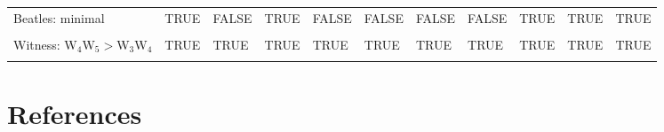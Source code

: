 \documentclass[
  10pt,
]{scrartcl}
\begin{document}
\begin{table}[H]
{\begin{tabular}[t]{lllllllllll}
Beatles: minimal & TRUE & FALSE & TRUE & FALSE & FALSE & FALSE & FALSE & TRUE & TRUE & TRUE\\
\cellcolor{gray!6}{Witness: W$_1$W$_2>$W$_3$W$_4$} & \cellcolor{gray!6}{TRUE} & \cellcolor{gray!6}{TRUE} & \cellcolor{gray!6}{TRUE} & \cellcolor{gray!6}{TRUE} & \cellcolor{gray!6}{TRUE} & \cellcolor{gray!6}{TRUE} & \cellcolor{gray!6}{TRUE} & \cellcolor{gray!6}{TRUE} & \cellcolor{gray!6}{TRUE} & \cellcolor{gray!6}{TRUE}\\
Witness: W$_4$W$_5>$W$_3$W$_4$ & TRUE & TRUE & TRUE & TRUE & TRUE & TRUE & TRUE & TRUE & TRUE & TRUE\\
\cellcolor{gray!6}{Success rate} & \cellcolor{gray!6}{50\%} & \cellcolor{gray!6}{50\%} & \cellcolor{gray!6}{67\%} & \cellcolor{gray!6}{50\%} & \cellcolor{gray!6}{50\%} & \cellcolor{gray!6}{67\%} & \cellcolor{gray!6}{67\%} & \cellcolor{gray!6}{100\%} & \cellcolor{gray!6}{92\%} & \cellcolor{gray!6}{100\%}\\
\bottomrule
\end{tabular}}
\end{table}

\hypertarget{references}{%
\section*{References}\label{references}}
\end{document}
